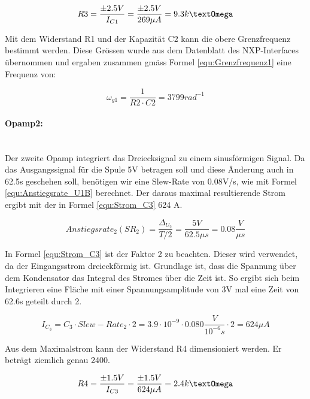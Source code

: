 \begin{equation}
R3 = \frac{\pm  2.5V}{I_{C1}} = \frac{\pm 2.5V}{269 \mu A} = 9.3k\textOmega
\label{equ:Dimensionierung_R1}
\end{equation}

Mit dem Widerstand R1 und der Kapazität C2 kann die obere Grenzfrequenz bestimmt werden. Diese Grössen wurde aus dem Datenblatt des NXP-Interfaces übernommen und ergaben zusammen gmäss Formel \ref{equ:Grenzfrequenz1} eine Frequenz von:

\begin{equation}
\omega_{g1} = \frac{1}{R2 \cdot C2} = 3799 rad^{-1}
\label{equ:Grenzfrequenz1}
\end{equation}

\paragraph{Opamp2:}\mbox{}\\

Der zweite Opamp integriert das Dreiecksignal zu einem sinusförmigen Signal. Da das Ausgangssignal für die Spule 5V betragen soll und diese Änderung auch in 62.5\textmu s geschehen soll, benötigen wir eine Slew-Rate von 0.08V/\textmu s, wie mit Formel \ref{equ:Anstiegsrate_U1B} berechnet. Der daraus maximal resultierende Strom ergibt mit der in Formel \ref{equ:Strom_C3} 624 \textmu A.

\begin{equation}
Anstiegsrate_2 (SR_2) = \frac{\Delta_{U_2}}{T/2} = \frac{5V}{62.5 \mu s} = 0.08\frac{V}{\mu s}
\label{equ:Anstiegsrate_U1B}
\end{equation}

In Formel \ref{equ:Strom_C3} ist der Faktor 2 zu beachten. Dieser wird verwendet, da der Eingangsstrom dreieckförmig ist. Grundlage ist, dass die Spannung über dem Kondensator das Integral des Stromes über die Zeit ist. So ergibt sich beim Integrieren eine Fläche mit einer Spannungsamplitude von 3V mal eine Zeit von 62.6\textmu s geteilt durch 2.

\begin{equation}
I_{C_3} = C_3 \cdot Slew-Rate_2  \cdot 2= 3.9 \cdot 10^{-9} \cdot 0.080\frac{V}{10^{-6}s}  \cdot 2 = 624 \mu A
\label{equ:Strom_C3}
\end{equation}

Aus dem Maximalstrom kann der Widerstand R4 dimensioniert werden. Er beträgt ziemlich genau 2400\textOmega.

\begin{equation}
R4 = \frac{\pm 1.5V}{I_{C3}} = \frac{\pm 1.5V}{624 \mu A} = 2.4k\textOmega
\label{equ:Dimensionierung_R4}
\end{equation}

